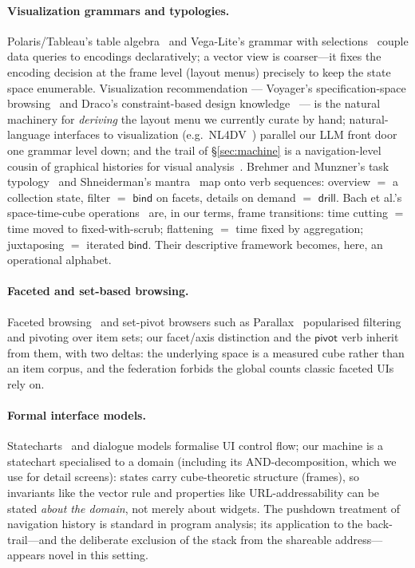 \documentclass[11pt,a4paper]{article}
\theoremstyle{remark}
\newcommand{\vbind}{\mathsf{bind}}
\newcommand{\vdrill}{\mathsf{drill}}
\newcommand{\vpivot}{\mathsf{pivot}}
\begin{document}
\paragraph{Visualization grammars and typologies.} Polaris/Tableau's table
algebra~\cite{polaris} and Vega-Lite's grammar with selections~\cite{vegalite}
couple data queries to encodings declaratively; a vector view is coarser---it
fixes the encoding decision at the frame level (layout menus) precisely to keep the
state space enumerable. Visualization recommendation --- Voyager's
specification-space browsing~\cite{voyager} and Draco's constraint-based design
knowledge~\cite{draco} --- is the natural machinery for \emph{deriving} the
layout menu we currently curate by hand; natural-language interfaces to
visualization (e.g.\ NL4DV~\cite{nl4dv}) parallel our LLM front door one
grammar level down; and the trail of \S\ref{sec:machine} is a navigation-level
cousin of graphical histories for visual analysis~\cite{heer2008}. Brehmer and Munzner's task typology~\cite{brehmer} and
Shneiderman's mantra~\cite{shneiderman} map onto verb sequences: overview $=$ a
collection state, filter $=$ $\vbind$ on facets, details on demand $=$ $\vdrill$.
Bach et al.'s space-time-cube operations~\cite{bach} are, in our terms, frame
transitions: time cutting $=$ time moved to fixed-with-scrub; flattening $=$ time
fixed by aggregation; juxtaposing $=$ iterated $\vbind$. Their descriptive
framework becomes, here, an operational alphabet.

\paragraph{Faceted and set-based browsing.} Faceted browsing~\cite{yee} and
set-pivot browsers such as Parallax~\cite{parallax} popularised filtering and
pivoting over item sets; our facet/axis distinction and the $\vpivot$ verb inherit
from them, with two deltas: the underlying space is a measured cube rather than an
item corpus, and the federation forbids the global counts classic faceted UIs rely
on.

\paragraph{Formal interface models.} Statecharts~\cite{harel} and dialogue models
formalise UI control flow; our machine is a statechart specialised to a domain
(including its AND-decomposition, which we use for detail screens):
states carry cube-theoretic structure (frames), so invariants like the vector rule
and properties like URL-addressability can be stated \emph{about the domain}, not
merely about widgets. The pushdown treatment of navigation history is standard in
program analysis; its application to the back-trail---and the deliberate exclusion
of the stack from the shareable address---appears novel in this setting.
\end{document}
